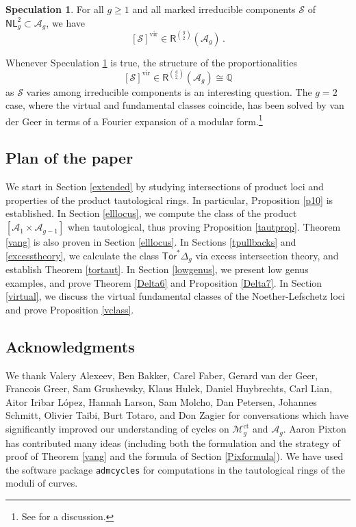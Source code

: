 \documentclass[11pt]{amsart}
\theoremstyle{definition}
\newtheorem{speculation}[thm]{Speculation}
\newcommand{\qq}{\mathbb{Q}}
\newcommand{\M}{\mathcal{M}}
\newcommand{\A}{\mathcal{A}}
\DeclareMathOperator{\ct}{ct}
\newcommand{\Tor}{\mathsf{Tor}}
\begin{document}
{\begin{speculation}\label{socvir}  For all $g\geq 1$
and all
marked irreducible components $\mathcal{S}$ of $\mathsf{NL}^2_g \subset \mathcal{A}_g$, we have
$$  [\mathcal{S}]^{\mathrm{vir}} \in  \mathsf{R}^{\binom{g}{2}}(\A_g)\, . $$
\end{speculation}
\noindent 
Whenever Speculation \ref{socvir} is true, the structure of the proportionalities $$[\mathcal{S}]^{\mathrm{vir}}\in \mathsf{R}^{\binom{g}{2}}(\A_g) \cong \qq$$
as $\mathcal{S}$ varies among irreducible components is an interesting question.
The $g=2$ case, where the
virtual and fundamental classes coincide, has been solved
by van der Geer \cite{vdgold} in
terms of 
a Fourier expansion of a modular form.\footnote{See \cite{Iribar} for a discussion.}



\subsection {Plan of the paper}  We start in Section \ref{extended} by studying intersections of product loci and properties of the product tautological rings. In particular, Proposition \ref{p10} is established. In Section \ref{elllocus}, we  compute the class of the product $[\A_1\times \A_{g-1}]$ when tautological, thus proving Proposition \ref{tautprop}.  Theorem \ref{vang} is also proven in Section \ref{elllocus}.  In Sections \ref{tpullbacks} and \ref{excesstheory}, we calculate the class $\Tor^*\Delta_g$ via excess intersection theory, and establish Theorem \ref{tortaut}. In Section \ref{lowgenus}, we present low genus examples, and prove Theorem \ref{Delta6} and Proposition \ref{Delta7}. 
In Section \ref{virtual}, we discuss the virtual fundamental classes of the Noether-Lefschetz loci and prove Proposition \ref{vclass}.

\subsection*{Acknowledgments}
We thank Valery Alexeev, Ben Bakker, Carel Faber, 
Gerard van der Geer, 
Francois Greer,
Sam Grushevsky, 
Klaus Hulek, 
Daniel Huybrechts, Carl Lian, Aitor Iribar L\'opez, Hannah Larson, Sam Molcho, Dan Petersen,  
Johannes Schmitt,  Olivier Ta\"ibi, Burt Totaro, and Don Zagier 
for conversations which
have significantly improved our understanding of cycles on 
$\M_g^{\ct}$ and $\A_g$.
Aaron Pixton has contributed many ideas (including both the formulation and the strategy of proof of Theorem \ref{vang} and the formula
of Section \ref{Pixformula}).
We have used the software package \texttt{admcycles} \cite{admcycles} 
for computations in the tautological rings of the moduli of curves. 


}
\end{document}
